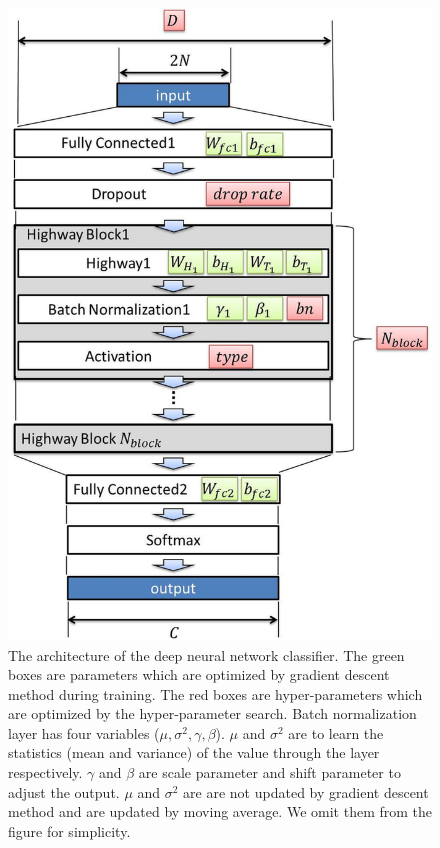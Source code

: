 \documentclass[useamsfonts]{pasj01}
\begin{document}
\begin{figure}[ht]
  \begin{center}
     \includegraphics[width=\columnwidth]{figures/model_all.eps}
  \end{center}
  \caption{\label{dnnmodel}
  The architecture of the deep neural network classifier. 
  The green boxes are parameters which are optimized by gradient descent method during training. The red boxes are hyper-parameters which are optimized by the hyper-parameter search. 
  Batch normalization layer has four variables ($\mu, \sigma^2, \gamma, \beta$). $\mu$ and $\sigma^2$ are to learn the statistics (mean and variance) of the value through the layer respectively.  $\gamma$ and $\beta$ are scale parameter and shift parameter to adjust the output. $\mu$ and $\sigma^2$ are are not updated by gradient descent method and are updated by moving average. We omit them from the figure for simplicity.
  }%
  \label{fig:dnn_model}
\end{figure}
\end{document}
